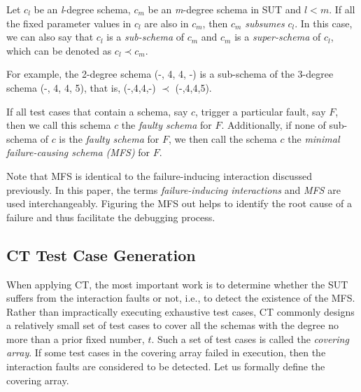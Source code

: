 \documentclass[journal,12pt,onecolumn,draftclsnofoot,]{IEEEtran}
\begin{document}
\begin{definition}
Let $c_{l}$ be an \emph{l}-degree schema, $c_{m}$ be an \emph{m}-degree schema in SUT and $l < m$. If all the fixed parameter values in $c_{l}$ are also in $c_{m}$, then $c_{m}$ \emph{subsumes} $c_{l}$. In this case, we can also say that $c_{l}$ is a \emph{sub-schema} of $c_{m}$ and $c_{m}$ is a \emph{super-schema} of $c_{l}$, which can be denoted as $c_{l} \prec  c_{m}$.
\end{definition}

For example,  the 2-degree schema (-, 4, 4, -) is a sub-schema of the 3-degree schema (-, 4, 4, 5), that is, (-,4,4,-) $\prec$ (-,4,4,5).

\begin{definition}
If all test cases that contain a schema, say $c$, trigger a particular fault, say $F$, then we call this schema $c$ the \emph{faulty schema} for $F$. Additionally, if none of sub-schema of $c$ is the \emph{faulty schema} for $F$, we then call the schema $c$ the \emph{minimal failure-causing schema (MFS)} \cite{nie2011minimal} for $F$.

\end{definition}

Note that MFS is identical to the failure-inducing interaction discussed previously. In this paper, the terms \emph{failure-inducing interactions} and \emph{MFS} are used interchangeably. Figuring the MFS out helps to identify the root cause of a failure and thus facilitate the debugging process.



\subsection{CT Test Case Generation}\label{sec:back:gen}
When applying CT, the most important work is to determine whether the SUT suffers from the interaction faults or not, i.e., to  detect the existence of the MFS. Rather than impractically executing exhaustive test cases, CT commonly designs a relatively small set of test cases to cover all the schemas with the degree no more than a prior fixed number, $t$. Such a set of test cases is called the \emph{covering array}.  If some test cases in the covering array failed in execution, then the interaction faults are considered to be detected. Let us formally define the covering array.
\end{document}
